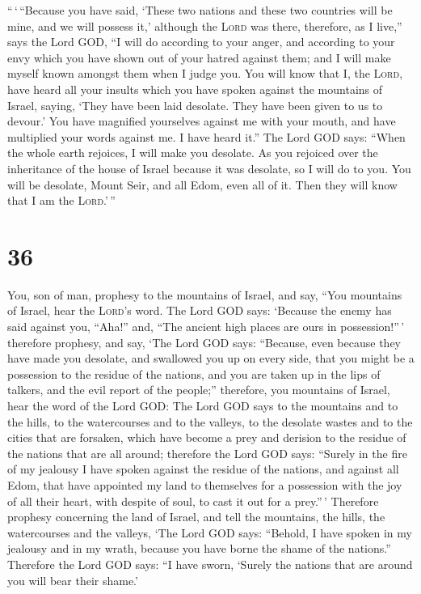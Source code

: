  ``\,`\,``Because you have said, `These two nations and
these two countries will be mine, and we will possess it,' although the
\textsc{Lord} was there,  therefore, as I live,'' says
the Lord GOD, ``I will do according to your anger, and according to your
envy which you have shown out of your hatred against them; and I will
make myself known amongst them when I judge you.  You
will know that I, the \textsc{Lord}, have heard all your insults which
you have spoken against the mountains of Israel, saying, `They have been
laid desolate. They have been given to us to devour.' 
You have magnified yourselves against me with your mouth, and have
multiplied your words against me. I have heard it.''  The
Lord GOD says: ``When the whole earth rejoices, I will make you
desolate.  As you rejoiced over the inheritance of the
house of Israel because it was desolate, so I will do to you. You will
be desolate, Mount Seir, and all Edom, even all of it. Then they will
know that I am the \textsc{Lord}.'\,''

\hypertarget{section-35}{%
\section{36}\label{section-35}}

 You, son of man, prophesy to the mountains of Israel, and
say, ``You mountains of Israel, hear the \textsc{Lord}'s word.
 The Lord GOD says: `Because the enemy has said against
you, ``Aha!'' and, ``The ancient high places are ours in
possession!''\,'  therefore prophesy, and say, `The Lord
GOD says: ``Because, even because they have made you desolate, and
swallowed you up on every side, that you might be a possession to the
residue of the nations, and you are taken up in the lips of talkers, and
the evil report of the people;''  therefore, you mountains
of Israel, hear the word of the Lord GOD: The Lord GOD says to the
mountains and to the hills, to the watercourses and to the valleys, to
the desolate wastes and to the cities that are forsaken, which have
become a prey and derision to the residue of the nations that are all
around;  therefore the Lord GOD says: ``Surely in the fire
of my jealousy I have spoken against the residue of the nations, and
against all Edom, that have appointed my land to themselves for a
possession with the joy of all their heart, with despite of soul, to
cast it out for a prey.''\,'  Therefore prophesy
concerning the land of Israel, and tell the mountains, the hills, the
watercourses and the valleys, `The Lord GOD says: ``Behold, I have
spoken in my jealousy and in my wrath, because you have borne the shame
of the nations.''  Therefore the Lord GOD says: ``I have
sworn, `Surely the nations that are around you will bear their shame.'


